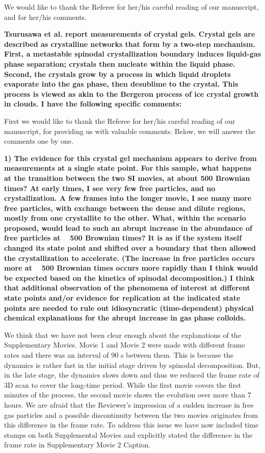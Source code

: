 \documentclass[11pt,a4paper]{article}
\newenvironment{referee}%
{\bigskip\singlespacing\bf}%
{\par\bigskip}
\begin{document}
We would like to thank the Referee for her/his careful reading of our manuscript, and for her/his comments.

\begin{referee}
Tsurusawa et al. report measurements of crystal gels. Crystal gels are described as crystalline networks that form by a two-step mechanism. First, a metastable spinodal crystallization boundary induces liquid-gas phase separation; crystals then nucleate within the liquid phase. Second, the crystals grow by a process in which liquid droplets evaporate into the gas phase, then desublime to the crystal. This process is viewed as akin to the Bergeron process of ice crystal growth in clouds. I have the following specific comments:
\end{referee}


First we would like to thank the Referee for her/his careful reading of our manuscript, for providing us with valuable comments. Below, we will answer the comments one by one. 


\begin{referee}
1) The evidence for this crystal gel mechanism appears to derive from measurements at a single state point. For this sample, what happens at the transition between the two SI movies, at about 500 Brownian times? At early times, I see very few free particles, and no crystallization. A few frames into the longer movie, I see many more free particles, with exchange between the dense and dilute regions, mostly from one crystallite to the other. What, within the scenario proposed, would lead to such an abrupt increase in the abundance of free particles at ~ 500 Brownian times? It is as if the system itself changed its state point and shifted over a boundary that then allowed the crystallization to accelerate. (The increase in free particles occurs more at ~ 500 Brownian times occurs more rapidly than I think would be expected based on the kinetics of spinodal decomposition.) I think that additional observation of the phenomena of interest at different state points and/or evidence for replication at the indicated 
state points are needed to rule out idiosyncratic (time-dependent) physical chemical explanations for the abrupt increase in gas phase colloids.
\end{referee}


We think that we have not been clear enough about the explanations of the Supplementary Movies. Movie 1 and Movie 2 were made with different frame rates and there was an interval of 90 s between them. This is because the dynamics is rather fast in the initial stage driven by spinodal decomposition. But, in the late stage, the dynamics slows down and thus we reduced the frame rate of 3D scan to cover the long-time period. While the first movie covers the first minutes of the process, the second movie shows the evolution over more than 7 hours. We are afraid that the Reviewer’s impression of a sudden increase in free gas particles and a possible discontinuity between the two movies originates from this difference in the frame rate. 
To address this issue we have now included time stamps on both Supplemental Movies and explicitly stated the difference in the frame rate in Supplementary Movie 2 Caption.
\end{document}
